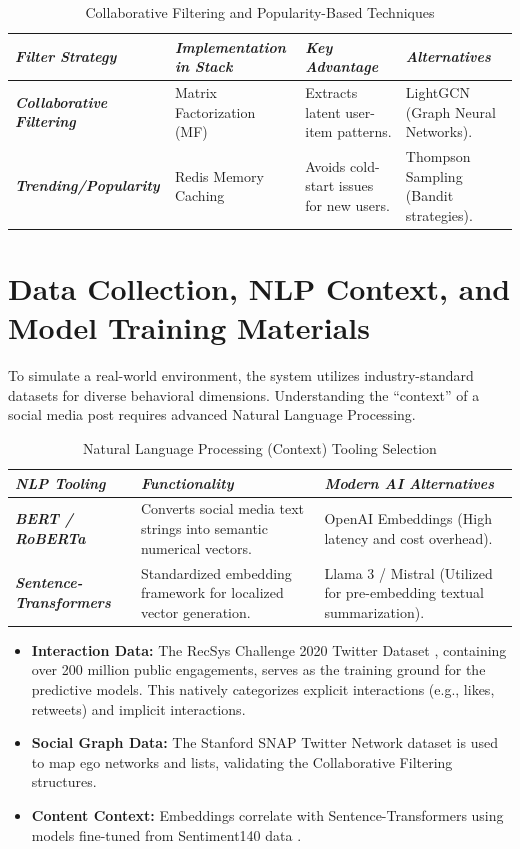 \begin{table}[htbp]
\centering
\caption{Collaborative Filtering and Popularity-Based Techniques}
\label{tab:cf-pop}
\begin{tabularx}{\textwidth}{XXXX}
\toprule
\textbf{\textit{Filter Strategy}} & \textbf{\textit{Implementation in Stack}} & \textbf{\textit{Key Advantage}} & \textbf{\textit{Alternatives}} \\
\midrule
\textbf{\textit{Collaborative Filtering}} & Matrix Factorization (MF) & Extracts latent user-item patterns. & LightGCN (Graph Neural Networks). \\
\rowcolor{gray!10}
\textbf{\textit{Trending/Popularity}} & Redis Memory Caching & Avoids cold-start issues for new users. & Thompson Sampling (Bandit strategies). \\
\bottomrule
\end{tabularx}
\end{table}

\section{Data Collection, NLP Context, and Model Training Materials}
To simulate a real-world environment, the system utilizes industry-standard datasets for diverse behavioral dimensions. Understanding the ``context'' of a social media post requires advanced Natural Language Processing.

\begin{table}[htbp]
\centering
\caption{Natural Language Processing (Context) Tooling Selection}
\label{tab:nlp}
\begin{tabularx}{\textwidth}{XXX}
\toprule
\textbf{\textit{NLP Tooling}} & \textbf{\textit{Functionality}} & \textbf{\textit{Modern AI Alternatives}} \\
\midrule
\textbf{\textit{BERT / RoBERTa}} & Converts social media text strings into semantic numerical vectors. & OpenAI Embeddings (High latency and cost overhead). \\
\rowcolor{gray!10}
\textbf{\textit{Sentence-Transformers}} & Standardized embedding framework for localized vector generation. & Llama 3 / Mistral (Utilized for pre-embedding textual summarization). \\
\bottomrule
\end{tabularx}
\end{table}

\begin{itemize}
    \item \textbf{Interaction Data:} The RecSys Challenge 2020 Twitter Dataset \cite{recsys2020}, containing over 200 million public engagements, serves as the training ground for the predictive models. This natively categorizes explicit interactions (e.g., likes, retweets) and implicit interactions.
    \item \textbf{Social Graph Data:} The Stanford SNAP Twitter Network dataset \cite{snap2014} is used to map ego networks and lists, validating the Collaborative Filtering structures.
    \item \textbf{Content Context:} Embeddings correlate with Sentence-Transformers using models fine-tuned from Sentiment140 data \cite{sentiment140}.
\end{itemize}

